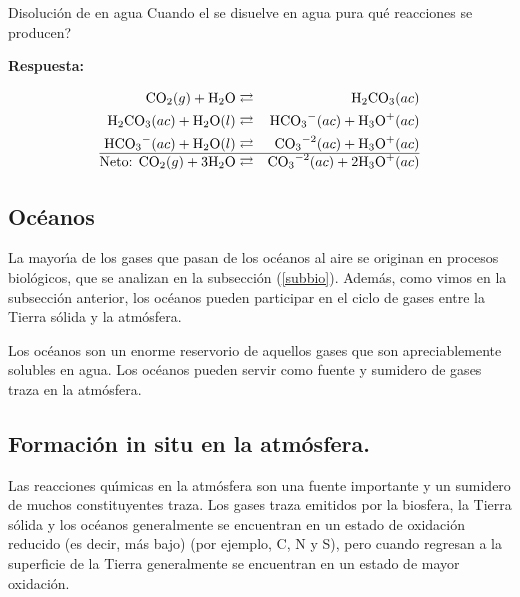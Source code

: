 \begin{ejemplo}{Disoluci\'on de  en agua} 
Cuando el  se disuelve en agua pura \textquestiondown qu\'e reacciones se producen?

\textbf{Respuesta:}

\begin{footnotesize}
\begin{eqnarray}
\ce{CO2}(g) + \ce{H2O} &\rightleftarrows& \ce{H2CO3}(ac) \\
\ce{H2CO3}(ac) + \ce{H2O}(l) &\rightleftarrows&  \ce{HCO3^-}(ac) + \ce{H3O^+}(ac) \\
 \ce{HCO3^-}(ac) + \ce{H2O}(l) &\rightleftarrows&  \ce{CO3^{-2}}(ac) + \ce{H3O^+}(ac) \\ \hline
 \textrm{Neto:         } \ce{CO2}(g) + 3\ce{H2O} &\rightleftarrows& \ce{CO3^{-2}}(ac) +2 \ce{H3O^+}(ac) 
 \end{eqnarray}
\end{footnotesize}
\end{ejemplo}

\subsection{Oc\'eanos}
La mayor\'{\i}a de los gases que pasan de los oc\'eanos al aire se originan en procesos biol\'ogicos, que se analizan en la subsecci\'on (\ref{subbio}). Adem\'as, como vimos en la subsecci\'on anterior, los oc\'eanos pueden participar en el ciclo de gases entre la Tierra s\'olida y la atm\'osfera. 

Los oc\'eanos son un enorme reservorio de aquellos gases que son apreciablemente solubles en agua. Los oc\'eanos pueden servir como fuente y sumidero de gases traza en la atm\'osfera.

\subsection{Formaci\'on in situ en la atm\'osfera.}

Las reacciones qu\'{\i}micas en la atm\'osfera son una fuente importante y un sumidero de muchos constituyentes traza. Los gases traza emitidos por la biosfera, la Tierra s\'olida y los oc\'eanos generalmente se encuentran en un estado de oxidaci\'on reducido (es decir, m\'as bajo) (por ejemplo, C, N y S), pero cuando regresan a la superficie de la Tierra generalmente se encuentran en un estado de  mayor oxidaci\'on.

